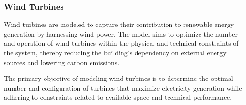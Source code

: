 \documentclass[11pt]{article}
\begin{document}
\subsubsection{Wind Turbines}
\label{sec:wind}

Wind turbines are modeled to capture their contribution to renewable energy generation by harnessing wind power. The model aims to optimize the number and operation of wind turbines within the physical and technical constraints of the system, thereby reducing the building's dependency on external energy sources and lowering carbon emissions.

The primary objective of modeling wind turbines is to determine the optimal number and configuration of turbines that maximize electricity generation while adhering to constraints related to available space and technical performance.
\end{document}
